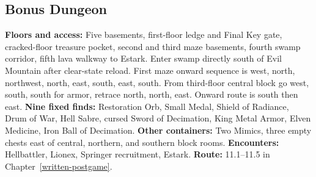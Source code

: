 \subsection{Bonus Dungeon}
\label{atlas-bonus}
\textbf{Floors and access:} Five basements, first-floor ledge and Final Key gate, cracked-floor treasure pocket, second and third maze basements, fourth swamp corridor, fifth lava walkway to Estark. Enter swamp directly south of Evil Mountain after clear-state reload. First maze onward sequence is west, north, northwest, north, east, south, east, south. From third-floor central block go west, south, south for armor, retrace north, north, east. Onward route is south then east. \textbf{Nine fixed finds:} Restoration Orb, Small Medal, Shield of Radiance, Drum of War, Hell Sabre, cursed Sword of Decimation, King Metal Armor, Elven Medicine, Iron Ball of Decimation. \textbf{Other containers:} Two Mimics, three empty chests east of central, northern, and southern block rooms. \textbf{Encounters:} Hellbattler, Lionex, Springer recruitment, Estark. \textbf{Route:} 11.1--11.5 in Chapter~\ref{written-postgame}.

